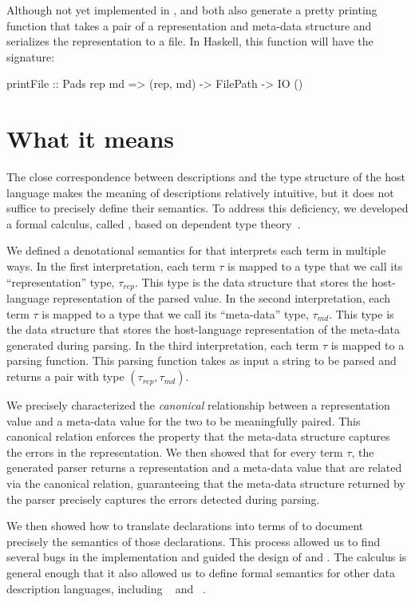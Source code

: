 \documentclass{sig-alternate}
\begin{document}
Although not yet implemented in \padshaskell{}, \padsc{} and
\padsml{} both also generate a pretty printing function that takes a
pair of a representation and meta-data structure and serializes the
representation to a file.  In Haskell, this function will have the
signature:
\begin{code}
printFile :: Pads rep md => 
             (rep, md) -> FilePath -> IO ()
\end{code}



\section{What it means}
\label{sec:formal}
The close correspondence between \pads{} descriptions and the type
structure of the host language makes the meaning of \pads{}
descriptions relatively intuitive, but it does not suffice to
precisely define their semantics.  To address this deficiency, we
developed a formal calculus, called \ddca{}, based on dependent type
theory~\cite{Fisher+:ddca}.  

We defined a denotational semantics for \ddca{} that interprets
each term in multiple ways.  In the first interpretation, each \ddca{}
term $\tau$ is mapped to a type that we call its ``representation''
type, $\tau_{rep}$.  This type is the data structure that stores the
host-language representation of the parsed value.  In the second
interpretation, each \ddca{} term $\tau$ is mapped to a type that we
call its ``meta-data'' type, $\tau_{md}$.  This type is the data
structure that stores the host-language representation of the
meta-data generated during parsing.  In the third interpretation, each
\ddca{} term $\tau$ is mapped to a parsing function.  This parsing
function takes as input a string to be parsed and returns a pair with
type $(\tau_{rep}, \tau_{md})$.

We precisely characterized the \textit{canonical} relationship between a
representation value and a meta-data value for the two to be
meaningfully paired.  This canonical relation enforces the property
that the meta-data structure captures the errors in the
representation.  We then showed that for every \ddca{} term $\tau$,
the generated parser returns a representation and a meta-data value
that are related via the canonical relation, guaranteeing that the
meta-data structure returned by the parser precisely captures the
errors detected during parsing. 

We then showed how to translate \pads{} declarations into terms of
\ddca{} to document precisely the semantics of those declarations.
This process allowed us to find several bugs in the \padsc{}
implementation and guided the design of \padsml{} and \padshaskell{}. 
The \ddca{} calculus is general enough that it also allowed us to
define formal semantics for other data description languages,
including \packettypes{}~\cite{sigcomm00} and
\datascript{}~\cite{gpce02}. 
\end{document}
